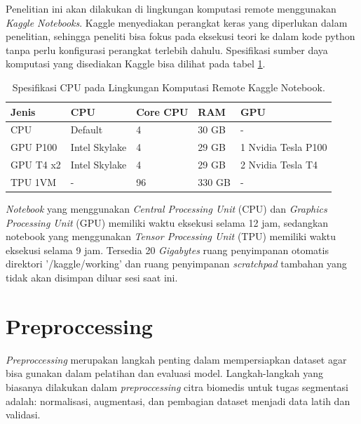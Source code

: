 \noindent Penelitian ini akan dilakukan di lingkungan komputasi remote menggunakan \textit{Kaggle Notebooks}. Kaggle menyediakan perangkat keras yang diperlukan dalam penelitian, sehingga peneliti bisa fokus pada eksekusi teori ke dalam kode python tanpa perlu konfigurasi perangkat terlebih dahulu. Spesifikasi sumber daya komputasi yang disediakan Kaggle bisa dilihat pada tabel \ref{tab:cpu_specs}.
\begin{table}[h]
	\centering
	\caption{Spesifikasi CPU pada Lingkungan Komputasi Remote Kaggle Notebook.} %
	\label{tab:cpu_specs}
	\begin{tabular}{lllll}
		\hline
		\textbf{Jenis} & \textbf{CPU}                             & \textbf{Core CPU} & \textbf{RAM} & \textbf{GPU}        \\ \hline
		CPU            & Default & 4                 & 30 GB        & -                   \\ \hline
		GPU P100       & Intel Skylake                            & 4                 & 29 GB        & 1 Nvidia Tesla P100 \\ \hline
		GPU T4 x2      & Intel Skylake                            & 4                 & 29 GB        & 2 Nvidia Tesla T4   \\ \hline
		TPU 1VM        & -                                        & 96                & 330 GB       & -                   \\ \hline
	\end{tabular}
\end{table}

\noindent \textit{Notebook} yang menggunakan \textit{Central Processing Unit }(CPU) dan \textit{Graphics Processing Unit} (GPU) memiliki waktu eksekusi selama 12 jam, sedangkan notebook yang menggunakan \textit{Tensor Processing Unit} (TPU) memiliki waktu eksekusi selama 9 jam. Tersedia 20 \textit{Gigabytes} ruang penyimpanan otomatis direktori '/kaggle/working' dan ruang penyimpanan \textit{scratchpad} tambahan yang tidak akan disimpan diluar sesi saat ini.


\section{Preproccessing}

\noindent \textit{Preproccessing} merupakan langkah penting dalam mempersiapkan dataset agar bisa gunakan dalam pelatihan dan evaluasi model. Langkah-langkah yang biasanya dilakukan dalam \textit{preproccessing} citra biomedis untuk tugas segmentasi adalah: normalisasi, augmentasi, dan pembagian dataset menjadi data latih dan validasi.

